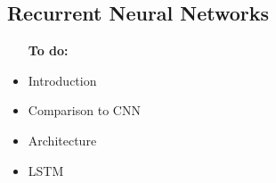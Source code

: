 

\subsection{Recurrent Neural Networks}

\begin{itemize}
    \item [\textbf{To do:}]
    \item Introduction
    \item Comparison to CNN
    \item Architecture
    \item LSTM
\end{itemize}







% 




